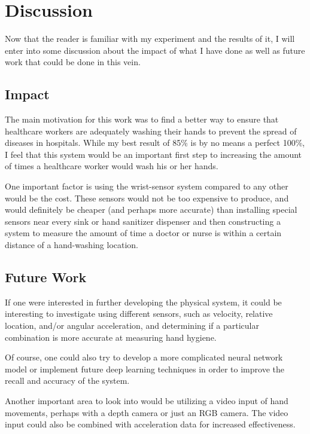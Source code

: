 \documentclass[]{report}
\begin{document}
\chapter{Discussion}

Now that the reader is familiar with my experiment and the results of it, I will enter into some discussion about the impact of what I have done as well as future work that could be done in this vein.

\section{Impact}

The main motivation for this work was to find a better way to ensure that healthcare workers are adequately washing their hands to prevent the spread of diseases in hospitals. While my best result of 85\% is by no means a perfect 100\%, I feel that this system would be an important first step to increasing the amount of times a healthcare worker would wash his or her hands.

One important factor is using the wrist-sensor system compared to any other would be the cost. These sensors would not be too expensive to produce, and would definitely be cheaper (and perhaps more accurate) than installing special sensors near every sink or hand sanitizer dispenser and then constructing a system to measure the amount of time a doctor or nurse is within a certain distance of a hand-washing location.

\section{Future Work}

If one were interested in further developing the physical system, it could be interesting to investigate using different sensors, such as velocity, relative location, and/or angular acceleration, and determining if a particular combination is more accurate at measuring hand hygiene.

Of course, one could also try to develop a more complicated neural network model or implement future deep learning techniques in order to improve the recall and accuracy of the system.

Another important area to look into would be utilizing a video input of hand movements, perhaps with a depth camera or just an RGB camera. The video input could also be combined with acceleration data for increased effectiveness.
\end{document}
